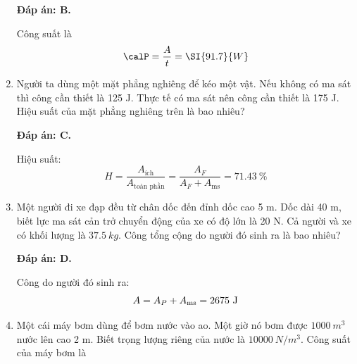 \begin{enumerate}[label=\bfseries Câu \arabic*:]
	\loigiai
	{\textbf{Đáp án: B.}
		
	Công suất là
$$\calP = \dfrac{A}{t} = \SI{91.7}{W}$$
	}
	\item {}
	
	\cauhoi
	{Người ta dùng một mặt phẳng nghiêng để kéo một vật. Nếu không có ma sát thì công cần thiết là 125 J. Thực tế có ma sát nên công cần thiết là 175 J. Hiệu suất của mặt phẳng nghiêng trên là bao nhiêu?
		
		
	}
	
	\loigiai
	{\textbf{Đáp án: C.}
		
	Hiệu suất:
	$$H=\dfrac{A_\text{ích}}{A_\text{toàn phần}} = \dfrac{A_F}{A_F + A_\text{ms}} =\SI{71.43}{\%} $$
	}
	\item {}
	
	\cauhoi
	{Một người đi xe đạp đều từ chân dốc đến đỉnh dốc cao 5 m. Dốc dài 40 m, biết lực ma sát cản trở chuyển động của xe có độ lớn là 20 N. Cả người và xe có khối lượng là $\SI{37.5}{kg}$. Công tổng cộng do người đó sinh ra là bao nhiêu?
		
		
	}
	
	\loigiai
	{\textbf{Đáp án: D.}
		
		Công do người đó sinh ra:
		$$A=A_P + A_\text{ms} = 2675\ \text J$$	
	}
	\item {}
	
	\cauhoi
	{Một cái máy bơm dùng để bơm nước vào ao. Một giờ nó bơm được $\SI{1000}{m^3}$ nước lên cao 2 m. Biết trọng lượng riêng của nước là $\SI{10000}{N/m^3}$. Công suất của máy bơm là
		
		
}
\end{enumerate}
